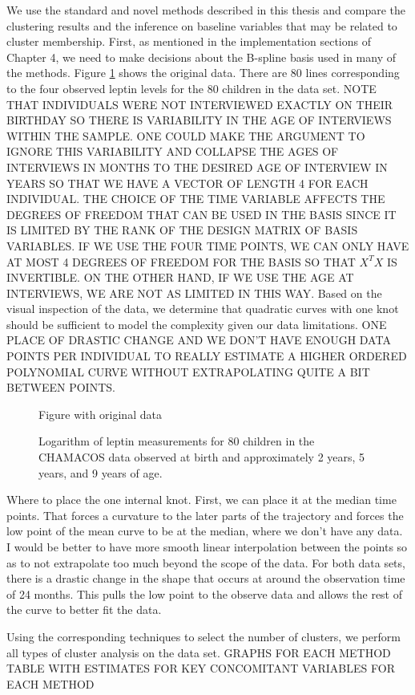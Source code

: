 \documentclass[11pt]{article}
\begin{document}
We use the standard and novel methods described in this thesis and compare the clustering results and the inference on baseline variables that may be related to cluster membership. First, as mentioned in the implementation sections of Chapter 4, we need to make decisions about the B-spline basis used in many of the methods. Figure \ref{fig:leptin} shows the original data. There are 80 lines corresponding to the four observed leptin levels for the 80 children in the data set. NOTE THAT INDIVIDUALS WERE NOT INTERVIEWED EXACTLY ON THEIR BIRTHDAY SO THERE IS VARIABILITY IN THE AGE OF INTERVIEWS WITHIN THE SAMPLE. ONE COULD MAKE THE ARGUMENT TO IGNORE THIS VARIABILITY AND COLLAPSE THE AGES OF INTERVIEWS IN MONTHS TO THE DESIRED AGE OF INTERVIEW IN YEARS SO THAT WE HAVE A VECTOR OF LENGTH 4 FOR EACH INDIVIDUAL. THE CHOICE OF THE TIME VARIABLE AFFECTS THE DEGREES OF FREEDOM THAT CAN BE USED IN THE BASIS SINCE IT IS LIMITED BY THE RANK OF THE DESIGN MATRIX OF BASIS VARIABLES. IF WE USE THE FOUR TIME POINTS, WE CAN ONLY HAVE AT MOST 4 DEGREES OF FREEDOM FOR THE BASIS SO THAT $X^{T}X$ IS INVERTIBLE. ON THE OTHER HAND, IF WE USE THE AGE AT INTERVIEWS, WE ARE NOT AS LIMITED IN THIS WAY. Based on the visual inspection of the data, we determine that quadratic curves with one knot should be sufficient to model the complexity given our data limitations. ONE PLACE OF DRASTIC CHANGE AND WE DON'T HAVE ENOUGH DATA POINTS PER INDIVIDUAL TO REALLY ESTIMATE A HIGHER ORDERED POLYNOMIAL CURVE WITHOUT EXTRAPOLATING QUITE A BIT BETWEEN POINTS.
\begin{figure}
\begin{center}
Figure with original data
\end{center}
\label{fig:leptin}
\caption{Logarithm of leptin measurements for 80 children in the CHAMACOS data observed at birth and approximately 2 years, 5 years, and 9 years of age. }
\end{figure}
Where to place the one internal knot. First, we can place it at the median time points. That forces a curvature to the later parts of the trajectory and forces the low point of the mean curve to be at the median, where we don't have any data. I would be better to have more smooth linear interpolation between the points so as to not extrapolate too much beyond the scope of the data. For both data sets, there is a drastic change in the shape that occurs at around the observation time of 24 months. This pulls the low point to the observe data and allows the rest of the curve to better fit the data.

Using the corresponding techniques to select the number of clusters, we perform all types of cluster analysis on the data set. 
GRAPHS FOR EACH METHOD
TABLE WITH ESTIMATES FOR KEY CONCOMITANT VARIABLES FOR EACH METHOD
\end{document}
